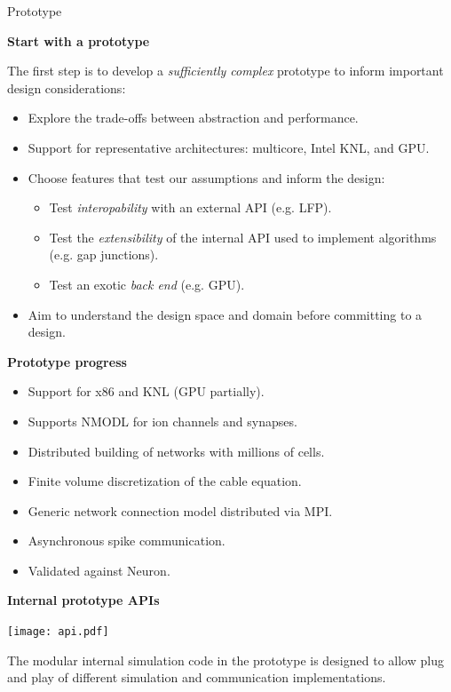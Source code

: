 \documentclass[a0paper,portrait]{baposter}
\newcommand{\centerheader}[1]{\begin{center}\bfseries\Large{#1}\end{center} \vspace{-6pt}}
\newcommand{\newemph}[1]{{\color{blue!40!black}\em #1}}
\begin{document}
\begin{poster}
\begin{posterbox}[name=nestmc,column=0,below=who,span=2]{Prototype}
    \begin{minipage}[t]{0.4\textwidth}
        \centerheader{Start with a prototype}
         The first step is to develop a \newemph{sufficiently complex} prototype to inform important design considerations:
        \begin{itemize}
            \item Explore the trade-offs between abstraction and performance.
            \item Support for representative architectures:
                  multicore, Intel KNL, and GPU.
            \item Choose features that test our assumptions and inform the design:
            \begin{itemize}
                \item Test \newemph{interopability} with an external API (e.g. LFP).
                \item Test the \newemph{extensibility} of the internal API used to implement algorithms (e.g. gap junctions).
                \item Test an exotic \newemph{back end} (e.g. GPU).
            \end{itemize}
            \item Aim to understand the design space and domain before committing to a design.
        \end{itemize}
   \end{minipage}
\hfill
    \begin{minipage}[t]{0.58\textwidth}
        \centerheader{Prototype progress}
            \vspace{-4pt} %
        \begin{itemize}
            \item Support for x86 and KNL (GPU partially).
            \item Supports NMODL for ion channels and synapses.
            \item Distributed building of networks with millions of cells.
            \item Finite volume discretization of the cable equation.
            \item Generic network connection model distributed via MPI.
            \item Asynchronous spike communication.
            \item Validated against Neuron.
        \end{itemize}
            \vspace{-8pt} %
        \centerheader{Internal prototype APIs}
        \texttt{[image: api.pdf]}
            \vspace{-25pt}
        \begin{center}\scriptsize{The modular internal simulation code in the prototype is designed to allow plug and play of different simulation and communication implementations.}\end{center}
   \end{minipage}


\end{posterbox}
\end{poster}
\end{document}

